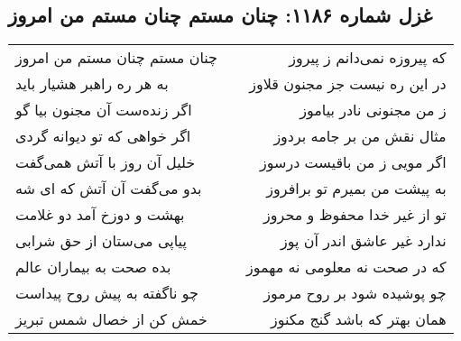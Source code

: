 \begin{center}
\section*{غزل شماره ۱۱۸۶: چنان مستم چنان مستم من امروز}
\label{sec:1186}
\begin{longtable}{l p{0.5cm} r}
چنان مستم چنان مستم من امروز
&&
که پیروزه نمی‌دانم ز پیروز
\\
به هر ره راهبر هشیار باید
&&
در این ره نیست جز مجنون قلاوز
\\
اگر زنده‌ست آن مجنون بیا گو
&&
ز من مجنونی نادر بیاموز
\\
اگر خواهی که تو دیوانه گردی
&&
مثال نقش من بر جامه بردوز
\\
خلیل آن روز با آتش همی‌گفت
&&
اگر مویی ز من باقیست درسوز
\\
بدو می‌گفت آن آتش که ای شه
&&
به پیشت من بمیرم تو برافروز
\\
بهشت و دوزخ آمد دو غلامت
&&
تو از غیر خدا محفوظ و محروز
\\
پیاپی می‌ستان از حق شرابی
&&
ندارد غیر عاشق اندر آن پوز
\\
بده صحت به بیماران عالم
&&
که در صحت نه معلومی نه مهموز
\\
چو ناگفته به پیش روح پیداست
&&
چو پوشیده شود بر روح مرموز
\\
خمش کن از خصال شمس تبریز
&&
همان بهتر که باشد گنج مکنوز
\\
\end{longtable}
\end{center}
